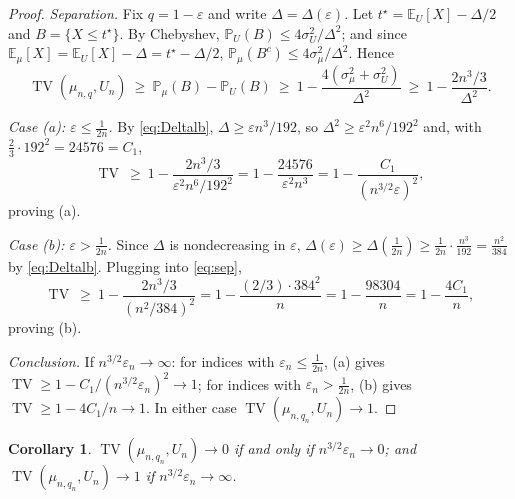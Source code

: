 \documentclass[12pt]{article}
\newtheorem{corollary}{Corollary}
\theoremstyle{definition}
\DeclareMathOperator{\TV}{TV}
\newcommand{\E}{\mathbb{E}}
\newcommand{\PP}{\mathbb{P}}
\newcommand{\eps}{\varepsilon}
\begin{document}
\begin{proof}
\emph{Separation.} Fix $q=1-\eps$ and write $\Delta=\Delta(\eps)$. Let
$t^\star=\E_U[X]-\Delta/2$ and $B=\{X\le t^\star\}$. By Chebyshev,
$\PP_U(B)\le 4\sigma_U^2/\Delta^2$; and since $\E_\mu[X]=\E_U[X]-\Delta=t^\star-\Delta/2$,
$\PP_\mu(B^c)\le 4\sigma_\mu^2/\Delta^2$. Hence
\begin{equation}\label{eq:sep}
\TV(\mu_{n,q},U_n)\ \ge\ \PP_\mu(B)-\PP_U(B)\ \ge\ 1-\frac{4(\sigma_\mu^2+\sigma_U^2)}{\Delta^2}
\ \ge\ 1-\frac{2n^3/3}{\Delta^2}.
\end{equation}

\emph{Case (a): $\eps\le\tfrac1{2n}$.} By \eqref{eq:Deltalb},
$\Delta\ge \eps n^3/192$, so $\Delta^2\ge \eps^2 n^6/192^2$ and, with
$\tfrac23\cdot192^2=24576=C_1$,
\[
\TV\ \ge\ 1-\frac{2n^3/3}{\eps^2 n^6/192^2}=1-\frac{24576}{\eps^2 n^3}
=1-\frac{C_1}{(n^{3/2}\eps)^2},
\]
proving (a).

\emph{Case (b): $\eps>\tfrac1{2n}$.} Since $\Delta$ is nondecreasing in $\eps$,
$\Delta(\eps)\ge\Delta(\tfrac1{2n})\ge \tfrac{1}{2n}\cdot\tfrac{n^3}{192}=\tfrac{n^2}{384}$
by \eqref{eq:Deltalb}. Plugging into \eqref{eq:sep},
\[
\TV\ \ge\ 1-\frac{2n^3/3}{(n^2/384)^2}=1-\frac{(2/3)\cdot384^2}{n}=1-\frac{98304}{n}
=1-\frac{4C_1}{n},
\]
proving (b).

\emph{Conclusion.} If $n^{3/2}\eps_n\to\infty$: for indices with $\eps_n\le\tfrac1{2n}$,
(a) gives $\TV\ge1-C_1/(n^{3/2}\eps_n)^2\to1$; for indices with $\eps_n>\tfrac1{2n}$,
(b) gives $\TV\ge1-4C_1/n\to1$. In either case $\TV(\mu_{n,q_n},U_n)\to1$.
\end{proof}

\begin{corollary}\label{cor:threshold}
$\TV(\mu_{n,q_n},U_n)\to0$ if and only if $n^{3/2}\eps_n\to0$; and
$\TV(\mu_{n,q_n},U_n)\to1$ if $n^{3/2}\eps_n\to\infty$.
\end{corollary}
\end{document}
